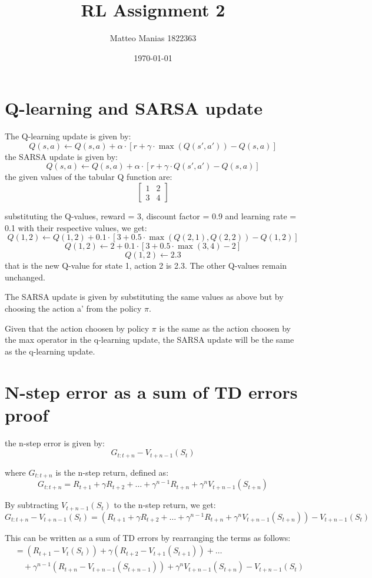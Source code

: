 \documentclass{article}
\title{RL Assignment 2}
\author{Matteo Manias 1822363}
\date{\today}  %
\begin{document}
\maketitle

\section{Q-learning and SARSA update}
The Q-learning update is given by:
\[
Q(s,a) \leftarrow Q(s,a) + \alpha \cdot [r + \gamma \cdot \max(Q(s',a')) - Q(s,a)]
\]
the SARSA update is given by:
\[
Q(s,a) \leftarrow Q(s,a) + \alpha \cdot [r + \gamma \cdot Q(s',a') - Q(s,a)]
\]
the given values of the tabular Q function are:
\[
\begin{bmatrix}
1 & 2 \\
3 & 4
\end{bmatrix}
\]



substituting the Q-values, reward = 3, discount factor = 0.9 and learning rate = 0.1 with their respective values, we get:
\[
Q(1,2) \leftarrow Q(1,2) + 0.1 \cdot [3 + 0.5 \cdot \max(Q(2,1),Q(2,2)) - Q(1,2)]
\]
\[
Q(1,2) \leftarrow 2 + 0.1 \cdot [3 + 0.5 \cdot \max(3,4) - 2]
\]
\[
Q(1,2) \leftarrow 2.3
\]
that is the new Q-value for state 1, action 2 is 2.3. The other Q-values remain unchanged.

The SARSA update is given by substituting the same values as above but by choosing the action a' from the policy $\pi$.

Given that the action choosen by policy $\pi$ is the same as the action choosen by the max operator in the q-learning update,
the SARSA update will be the same as the q-learning update.


\section{N-step error as a sum of TD errors proof}
the n-step error is given by:
\[ G_{t:t+n} - V_{t+n-1}(S_t) \]

where \( G_{t:t+n} \) is the n-step return, defined as:
\[
G_{t:t+n} = R_{t+1}
+ \gamma R_{t+2}
+ \ldots
+ \gamma^{n-1} R_{t+n}
+ \gamma^n V_{t+n-1}(S_{t+n})
\]

By subtracting \( V_{t+n-1}(S_t) \) to the n-step return, we get:
\[ 
G_{t:t+n} - V_{t+n-1}(S_t) = (R_{t+1} + \gamma R_{t+2}
+ \ldots
+ \gamma^{n-1} R_{t+n} + \gamma^n V_{t+n-1}(S_{t+n}))
- V_{t+n-1}(S_t)
\]

This can be written as a sum of TD errors by rearranging the terms as follows:
\begin{align*}
&= (R_{t+1} - V_{t}(S_t)) + \gamma(R_{t+2} - V_{t+1}(S_{t+1})) + \ldots \\
&\quad + \gamma^{n-1}(R_{t+n} - V_{t+n-1}(S_{t+n-1})) + \gamma^n V_{t+n-1}(S_{t+n}) - V_{t+n-1}(S_t)
\end{align*}
\end{document}
